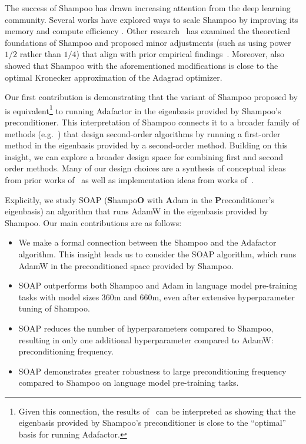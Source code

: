 \documentclass{article}
\begin{document}
The success of Shampoo has drawn increasing attention from the deep learning community. Several works have explored ways to scale Shampoo by improving its memory and compute efficiency \citep{4bitshampoo, anil2020scalable, distributedshampoo}. Other research~\citep{whyshampoo} has examined the theoretical foundations of Shampoo and proposed minor adjustments (such as using power $1/2$ rather than $1/4$) that align with prior empirical findings~\citep{anil2020scalable}. Moreover, \citet{whyshampoo} also showed that Shampoo with the aforementioned modifications is close to the optimal Kronecker approximation of the Adagrad \citep{adagrad} optimizer.

Our first contribution is demonstrating that the variant of Shampoo proposed by \citet{whyshampoo} is equivalent\footnote{Given this connection, the results of~\citet{whyshampoo} can be interpreted as showing that the eigenbasis provided by Shampoo's preconditioner is close to the ``optimal'' basis for running Adafactor.} to running Adafactor \citep{adafactor, zhai} in the eigenbasis provided by Shampoo's preconditioner. This interpretation of Shampoo connects it to a broader family of methods (e.g.~\citep{ekfac}) that design second-order algorithms by running a first-order method in the eigenbasis provided by a second-order method. Building on this insight, we can explore a broader design space for combining first and second order methods. Many of our design choices are a synthesis of conceptual ideas from prior works of~\citet{ekfac,anil2020scalable,whyshampoo} as well as implementation ideas from works of~\citet{4bitshampoo,galore}.

Explicitly, we study SOAP (\textbf{S}hampo\textbf{O} with \textbf{A}dam in the \textbf{P}reconditioner's eigenbasis) an algorithm that runs AdamW in the eigenbasis provided by Shampoo.  Our main contributions are as follows:

\begin{itemize} 
\item We make a formal connection between the Shampoo and the Adafactor algorithm. This insight leads us to consider the SOAP algorithm, which runs AdamW in the preconditioned space provided by Shampoo. 
\item SOAP outperforms both Shampoo and Adam in language model pre-training tasks with model sizes 360m and 660m, even after extensive hyperparameter tuning of Shampoo. 
\item SOAP reduces the number of hyperparameters compared to Shampoo, resulting in only one additional hyperparameter compared to AdamW: preconditioning frequency. 
\item SOAP demonstrates greater robustness to large preconditioning frequency compared to Shampoo on language model pre-training tasks.
\end{itemize}
\end{document}
